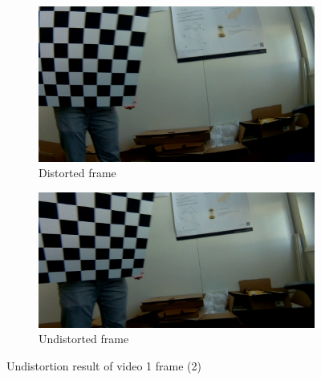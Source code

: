 \begin{figure}[h]
    \centering
    \begin{subfigure}[b]{0.48\textwidth}
        \centering
        \includegraphics[width=\textwidth]{figures/addl/img4_0.jpg}
        \caption{Distorted frame}
    \end{subfigure}
    \hfill
    \begin{subfigure}[b]{0.48\textwidth}
        \centering
        \includegraphics[width=\textwidth]{figures/addl/img4_5.jpg}
        \caption{Undistorted frame}
    \end{subfigure}
    \caption{Undistortion result of video 1 frame (2)}
    \label{fig:dist_1a2}
\end{figure}

